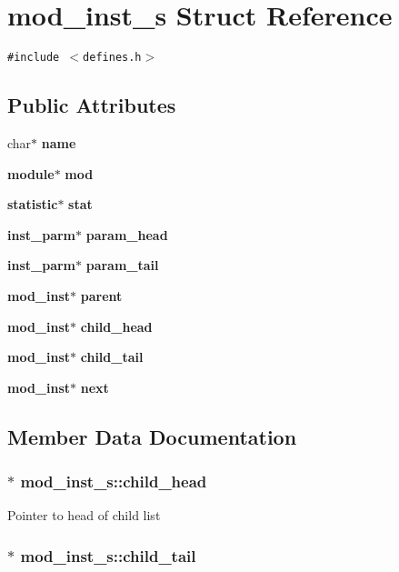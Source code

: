 \section{mod\_\-inst\_\-s  Struct Reference}
\label{structmod__inst__s}
{\tt \#include $<$defines.h$>$}

\subsection*{Public Attributes}
\begin{CompactItemize}
\item 
char$\ast$ {\bf name}
\item 
{\bf module}$\ast$ {\bf mod}
\item 
{\bf statistic}$\ast$ {\bf stat}
\item 
{\bf inst\_\-parm}$\ast$ {\bf param\_\-head}
\item 
{\bf inst\_\-parm}$\ast$ {\bf param\_\-tail}
\item 
{\bf mod\_\-inst}$\ast$ {\bf parent}
\item 
{\bf mod\_\-inst}$\ast$ {\bf child\_\-head}
\item 
{\bf mod\_\-inst}$\ast$ {\bf child\_\-tail}
\item 
{\bf mod\_\-inst}$\ast$ {\bf next}
\end{CompactItemize}


\subsection{Member Data Documentation}
\subsubsection{ $\ast$ mod\_\-inst\_\-s::child\_\-head}\label{structmod__inst__s_m6}


Pointer to head of child list 
\subsubsection{ $\ast$ mod\_\-inst\_\-s::child\_\-tail}\label{structmod__inst__s_m7}


